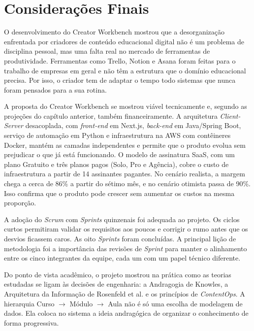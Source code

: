 \chapter{Considerações Finais}

O desenvolvimento do Creator Workbench mostrou que a desorganização enfrentada por criadores de conteúdo educacional digital não é um problema de disciplina pessoal, mas uma falta real no mercado de ferramentas de produtividade. Ferramentas como Trello, Notion e Asana foram feitas para o trabalho de empresas em geral e não têm a estrutura que o domínio educacional precisa. Por isso, o criador tem de adaptar o tempo todo sistemas que nunca foram pensados para a sua rotina.

A proposta do Creator Workbench se mostrou viável tecnicamente e, segundo as projeções do capítulo anterior, também financeiramente. A arquitetura \textit{Client-Server} desacoplada, com \textit{front-end} em Next.js, \textit{back-end} em Java/Spring Boot, serviço de automação em Python e infraestrutura na AWS com contêineres Docker, mantém as camadas independentes e permite que o produto evolua sem prejudicar o que já está funcionando. O modelo de assinatura SaaS, com um plano Gratuito e três planos pagos (Solo, Pro e Agência), cobre o custo de infraestrutura a partir de 14 assinantes pagantes. No cenário realista, a margem chega a cerca de 86\% a partir do sétimo mês, e no cenário otimista passa de 90\%. Isso confirma que o produto pode crescer sem aumentar os custos na mesma proporção.

A adoção do \textit{Scrum} com \textit{Sprints} quinzenais foi adequada ao projeto. Os ciclos curtos permitiram validar os requisitos aos poucos e corrigir o rumo antes que os desvios ficassem caros. As oito \textit{Sprints} foram concluídas. A principal lição de metodologia foi a importância das revisões de \textit{Sprint} para manter o alinhamento entre os cinco integrantes da equipe, cada um com um papel técnico diferente.

Do ponto de vista acadêmico, o projeto mostrou na prática como as teorias estudadas se ligam às decisões de engenharia: a Andragogia de Knowles, a Arquitetura da Informação de Rosenfeld et al. e os princípios de \textit{ContentOps}. A hierarquia Curso $\rightarrow$ Módulo $\rightarrow$ Aula não é só uma escolha de modelagem de dados. Ela coloca no sistema a ideia andragógica de organizar o conhecimento de forma progressiva.

